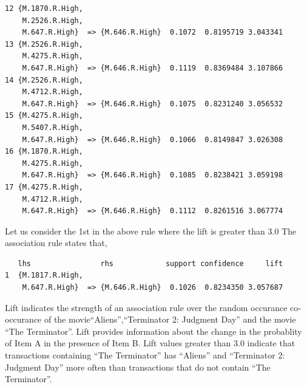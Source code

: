 \documentclass[a4paper,20pt]{article}
\begin{document}
\begin{verbatim}
12 {M.1870.R.High,                                              
    M.2526.R.High,                                              
    M.647.R.High}  => {M.646.R.High}  0.1072  0.8195719 3.043341
13 {M.2526.R.High,                                              
    M.4275.R.High,                                              
    M.647.R.High}  => {M.646.R.High}  0.1119  0.8369484 3.107866
14 {M.2526.R.High,                                              
    M.4712.R.High,                                              
    M.647.R.High}  => {M.646.R.High}  0.1075  0.8231240 3.056532
15 {M.4275.R.High,                                              
    M.5407.R.High,                                              
    M.647.R.High}  => {M.646.R.High}  0.1066  0.8149847 3.026308
16 {M.1870.R.High,                                              
    M.4275.R.High,                                              
    M.647.R.High}  => {M.646.R.High}  0.1085  0.8238421 3.059198
17 {M.4275.R.High,                                              
    M.4712.R.High,                                              
    M.647.R.High}  => {M.646.R.High}  0.1112  0.8261516 3.067774
\end{verbatim}

Let us consider the 1st in the above rule where the lift is greater than 3.0
The association rule states that,
\begin{verbatim}
   lhs                rhs            support confidence     lift
1  {M.1817.R.High,                                              
    M.647.R.High}  => {M.646.R.High}  0.1026  0.8234350 3.057687
\end{verbatim}

Lift indicates the strength of an association rule over the random
occurance co-occurance of the movie\newline``Aliens'',``Terminator 2: Judgment Day'' and the movie ``The Terminator''. Lift provides information about the change in the
probablity of Item A in the presence of Item B. Lift values greater than 3.0 indicate that transactions
containing ``The Terminator'' has ``Aliens'' and ``Terminator 2: Judgment Day'' more often than transactions
that do not contain ``The Terminator''.
\newpage
\end{document}
